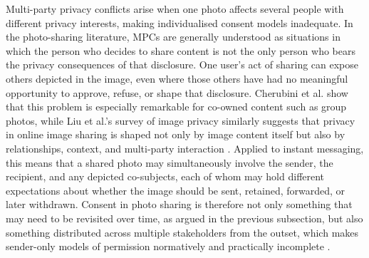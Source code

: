 Multi-party privacy conflicts arise when one photo affects several people with different privacy interests, making individualised consent models inadequate. In the photo-sharing literature, MPCs are generally understood as situations in which the person who decides to share content is not the only person who bears the privacy consequences of that disclosure. One user’s act of sharing can expose others depicted in the image, even where those others have had no meaningful opportunity to approve, refuse, or shape that disclosure. Cherubini et al. show that this problem is especially remarkable for co-owned content such as group photos, while Liu et al.’s survey of image privacy similarly suggests that privacy in online image sharing is shaped not only by image content itself but also by relationships, context, and multi-party interaction \cite{cherubini_2021, liu_privacy_2023}. Applied to instant messaging, this means that a shared photo may simultaneously involve the sender, the recipient, and any depicted co-subjects, each of whom may hold different expectations about whether the image should be sent, retained, forwarded, or later withdrawn. Consent in photo sharing is therefore not only something that may need to be revisited over time, as argued in the previous subsection, but also something distributed across multiple stakeholders from the outset, which makes sender-only models of permission normatively and practically incomplete \cite{cherubini_2021, liu_privacy_2023}.

